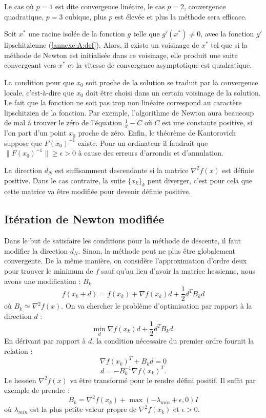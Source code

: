 Le cas o\`u $p=1$ est dite convergence lin\'eaire, le cas $p=2$, convergence quadratique, $p=3$ cubique, plus $p$
est \'elev\'ee et plus la m\'ethode sera efficace.

\begin{frtheoreme}
Soit $x^*$ une racine isol\'ee de la fonction $g$ telle que $g'(x^*)\neq 0$, avec la fonction $g'$ lipschitzienne (\ref{annexe:A:def}), 
 Alors, il existe un voisinage de $x^*$ tel que si la m\'ethode de Newton 
est initialis\'ee dans ce voisinage, elle produit une suite convergeant vers $x^*$ et la vitesse de convergence 
asymptotique est quadratique.
\end{frtheoreme}


La condition pour que $x_0$ soit proche de la solution se traduit par la convergence locale, c'est-\`a-dire que $x_0$ doit
être choisi dans un certain voisinage de la solution.
Le fait que la fonction ne soit pas trop non lin\'eaire correspond au caract\`ere lipschitzien 
de la fonction. Par exemple, l'algorithme de Newton aura beaucoup de mal \`a trouver le z\'ero de l'\'equation
$\frac{1}{x}-C$ o\`u $C$ est une constante positive, si l'on part d'un point $x_0$ proche de z\'ero.
 Enfin, le th\'eor\`eme de Kantorovich suppose que $F(x_0)^{-1}$ existe. Pour un 
ordinateur il faudrait que $\lVert F(x_0)^{-1}\rVert \geq \epsilon>0$ \`a cause des erreurs
d'arrondis et d'annulation.

La direction $d_N$ est suffisamment descendante si la matrice $\nabla^2 f(x)$ est d\'efinie positive. Dans le 
cas contraire, la suite $\{x_k\}_k$ peut diverger, c'est pour cela que cette matrice va être modifi\'ee pour 
devenir d\'efinie positive.

\subsection{It\'eration de Newton modifi\'ee}

Dans le but de satisfaire les conditions pour la m\'ethode de descente, il faut modifier la direction $d_N$.
 Sinon, la m\'ethode peut ne plus être globalement convergente. 
De la même mani\`ere, on consid\`ere l'approximation d'ordre deux pour trouver le minimum de $f$ sauf qu'au lieu
d'avoir la matrice hessienne, nous avons une modification : $B_k$
$$f(x_k+d)=f(x_k)+\nabla f(x_k)d+\frac{1}{2}d^TB_kd$$ 
o\`u $B_k\simeq \nabla^2f(x)$. On va chercher le probl\`eme d'optimisation par rapport \`a la direction $d$ :
$$\min_d\nabla f(x_k)d+\frac{1}{2}d^TB_kd.$$
En d\'erivant par rapport \`a $d$, la condition n\'ecessaire du premier ordre fournit la relation :
$$\nabla f(x_k)^T+B_kd=0$$
$$d=-B_k^{-1}\nabla f(x_k)^T.$$
Le hessien $\nabla^2f(x)$ va être transform\'e pour le rendre d\'efini positif. Il suffit par exemple de prendre :
$$B_k=\nabla^2 f(x_k)+\max(-\lambda_{min}+\epsilon,0)I$$
o\`u $\lambda_{min}$ est la plus petite valeur propre de $\nabla^2 f(x_k)$ et $\epsilon>0$.


